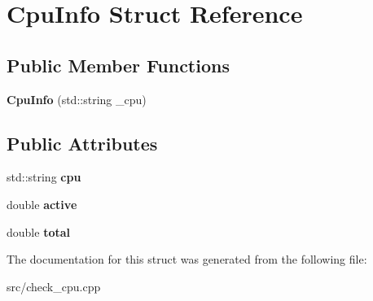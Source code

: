 \hypertarget{structCpuInfo}{\section{Cpu\-Info Struct Reference}
\label{structCpuInfo}
}
\subsection*{Public Member Functions}
\begin{DoxyCompactItemize}
\item 
\hypertarget{structCpuInfo_a38203104d13919adba759bafc8c3b090}{{\bfseries Cpu\-Info} (std\-::string \-\_\-cpu)}\label{structCpuInfo_a38203104d13919adba759bafc8c3b090}

\end{DoxyCompactItemize}
\subsection*{Public Attributes}
\begin{DoxyCompactItemize}
\item 
\hypertarget{structCpuInfo_a52aae13c009ada859537ccbdbf09daaa}{std\-::string {\bfseries cpu}}\label{structCpuInfo_a52aae13c009ada859537ccbdbf09daaa}

\item 
\hypertarget{structCpuInfo_a1763c74b54a48978223a5e7e92961953}{double {\bfseries active}}\label{structCpuInfo_a1763c74b54a48978223a5e7e92961953}

\item 
\hypertarget{structCpuInfo_a84e83ade2d568dd1ec1f784ffdccea83}{double {\bfseries total}}\label{structCpuInfo_a84e83ade2d568dd1ec1f784ffdccea83}

\end{DoxyCompactItemize}


The documentation for this struct was generated from the following file\-:\begin{DoxyCompactItemize}
\item 
src/check\-\_\-cpu.\-cpp\end{DoxyCompactItemize}
